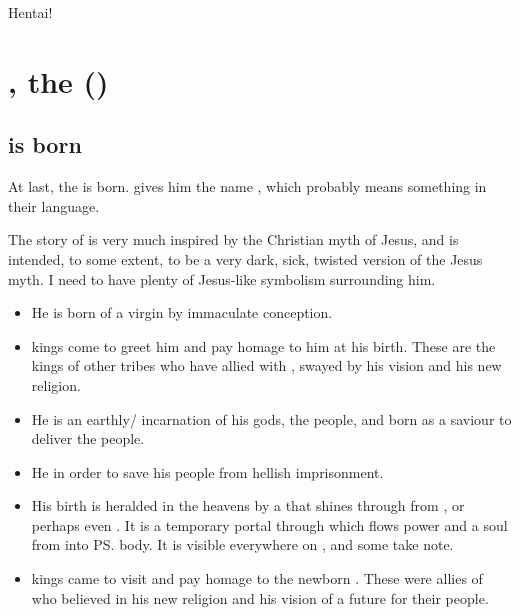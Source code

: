 Hentai!















\section{\Thanatzil{}, the \BaneMessiah ()}
\subsection{\Thanatzil{} is born}
At last, the \banemessiah{} is born. \Semiza{} gives him the name , which probably means something in their language. 

The story of \Thanatzil{} is very much inspired by the Christian myth of Jesus, and is intended, to some extent, to be a very dark, sick, twisted version of the Jesus myth. I need to have plenty of Jesus-like symbolism surrounding him.

\begin{itemize}
  \item 
    He is born of a virgin by immaculate conception.
  \item 
    \Nephilic{} kings come to greet him and pay homage to him at his birth. These are the kings of other tribes who have allied with \Semiza, swayed by his vision and his new religion. 
  \item
    He is an earthly/\Miithian{} incarnation of his gods, the \bane{} people, and born as a saviour to deliver the \nephilic{} people. 
  \item
    He  in order to save his people from hellish imprisonment. 
  \item 
    His birth is heralded in the heavens by a  that shines through from \Nyx, or perhaps even \Erebos. It is a temporary portal through which flows power and a \bane{} soul from \Nyx{} into \ps{\Thanatzil}{} body. It is visible everywhere on \Miith{}, and some \dragons{} take note.
  \item
    \Nephilic{} kings came to visit and pay homage to the newborn \Thanatzil. These were allies of \Semiza{} who believed in his new religion and his vision of a future for their people. 
\end{itemize}





